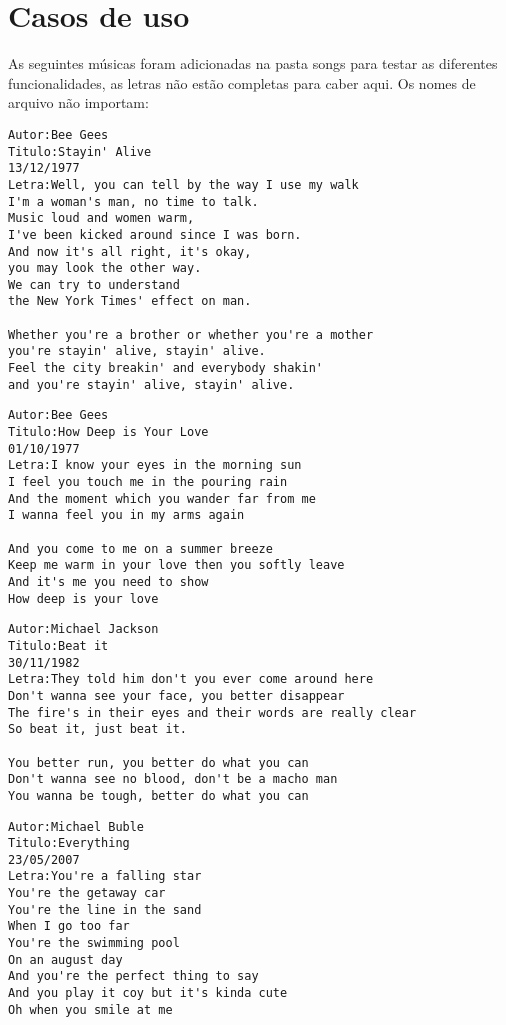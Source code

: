 \documentclass[12pt]{article}
\begin{document}
\section{Casos de uso}
As seguintes músicas foram adicionadas na pasta songs para testar as diferentes funcionalidades, as letras não estão completas para caber aqui. Os nomes de arquivo não importam:
\begin{multicols}{2}
\begin{lstlisting}[language={}]
Autor:Bee Gees
Titulo:Stayin' Alive
13/12/1977
Letra:Well, you can tell by the way I use my walk
I'm a woman's man, no time to talk.
Music loud and women warm,
I've been kicked around since I was born.
And now it's all right, it's okay,
you may look the other way.
We can try to understand
the New York Times' effect on man.

Whether you're a brother or whether you're a mother
you're stayin' alive, stayin' alive.
Feel the city breakin' and everybody shakin'
and you're stayin' alive, stayin' alive.
\end{lstlisting}
\columnbreak
\begin{lstlisting}[language={}]
Autor:Bee Gees
Titulo:How Deep is Your Love
01/10/1977
Letra:I know your eyes in the morning sun
I feel you touch me in the pouring rain
And the moment which you wander far from me
I wanna feel you in my arms again

And you come to me on a summer breeze
Keep me warm in your love then you softly leave
And it's me you need to show
How deep is your love
\end{lstlisting}
\end{multicols}
\begin{multicols}{2}
\begin{lstlisting}[language={}]
Autor:Michael Jackson
Titulo:Beat it
30/11/1982
Letra:They told him don't you ever come around here
Don't wanna see your face, you better disappear
The fire's in their eyes and their words are really clear
So beat it, just beat it.

You better run, you better do what you can
Don't wanna see no blood, don't be a macho man
You wanna be tough, better do what you can
\end{lstlisting}
\columnbreak
\begin{lstlisting}[language={}]
Autor:Michael Buble
Titulo:Everything
23/05/2007
Letra:You're a falling star
You're the getaway car
You're the line in the sand
When I go too far
You're the swimming pool
On an august day
And you're the perfect thing to say
And you play it coy but it's kinda cute
Oh when you smile at me
\end{lstlisting}
\end{multicols}
\end{document}

